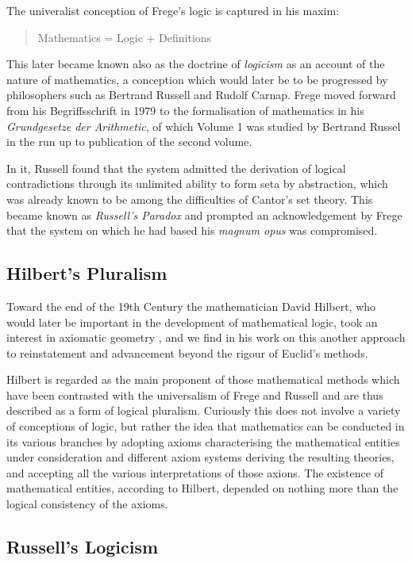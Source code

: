 The univeralist conception of Frege's logic is captured in his maxim:

\begin{quote}Mathematics = Logic + Definitions\end{quote}

  This later became known also as the doctrine of \emph{logicism} as an account of the nature of mathematics, a conception which would later be to be progressed by philosophers such as Bertrand Russell and Rudolf Carnap.
  Frege moved forward from his Begriffsschrift in 1979 to the formalisation of mathematics in his \emph{Grundgesetze der Arithmetic}\cite{frege93}, of which Volume 1 was studied by Bertrand Russel in the run up to publication of the second volume.

  In it, Russell found that the system admitted the derivation of logical contradictions through its unlimited ability to form seta by abstraction, which was already known to be among the difficulties of Cantor's set theory.
  This became known as \emph{Russell's Paradox} and prompted an acknowledgement by Frege that the system on which he had based his \emph{magnum opus} was compromised.

  \subsection{Hilbert's Pluralism}

  Toward the end of the 19th Century the mathematician David Hilbert, who would later be important in the development of mathematical logic, took an interest in axiomatic geometry \cite{hilbertFG}, and we find in his work on this another approach to reinstatement and  advancement beyond the rigour of Euclid's methods.

  Hilbert is regarded as the main proponent of those mathematical methods which have been contrasted with the universalism of Frege and Russell and are thus described as a form of logical pluralism.
  Curiously this does not involve a variety of conceptions of logic, but rather the idea that mathematics can be conducted in its various branches by adopting axioms characterising the mathematical entities under consideration and different axiom systems deriving the resulting theories, and accepting all the various interpretations of those axions.
  The existence of mathematical entities, according to Hilbert, depended on nothing more than the logical consistency of the axioms.

  \subsection{Russell's Logicism}
  
